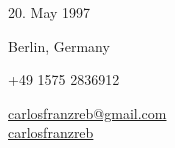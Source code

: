 \documentclass[]{commands}
\begin{document}
      
\vspace{0.3cm}   
\color{lightgray}\noindent\makebox[\textwidth]{\rule{\paperwidth-0.4cm}{2.5pt}}

\begin{info}
    \begin{flushleft}
    \small{20. May 1997}\hfill{\faCalendar}\\
    
    \vspace{1mm}

    \small{Berlin, Germany}\hfill{\faMapMarker}\\
    
    \vspace{1mm}
    
    {\small +49 1575 2836912}\hfill{\Mobilefone}\\

    \vspace{.8mm}
    
    \href{mailto:carlosfranzreb@gmail.com}{\small{carlosfranzreb@gmail.com}\hfill{\Large\Letter}\hspace{0.6mm}{\small \faMousePointer}}\\
    
    \href{https://github.com/carlosfranzreb}{\small{carlosfranzreb}\hfill{\Large\faGithub}\hspace{0.6mm}{\small \faMousePointer}}\\
    
    \end{flushleft}
\end{info}
\end{document}
